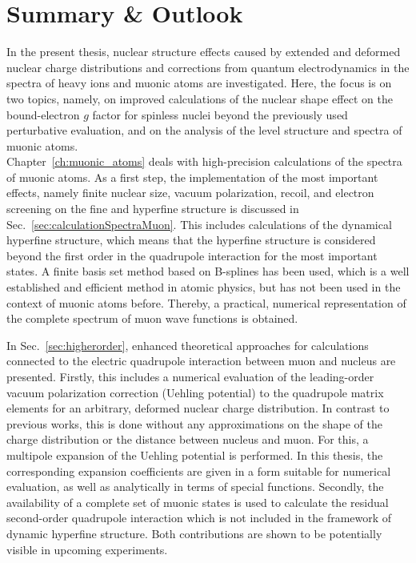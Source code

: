 \chapter*{Summary \& Outlook}
\label{ch:conclusion}

In the present thesis, nuclear structure effects caused by extended and deformed nuclear charge distributions and corrections from quantum electrodynamics in the spectra of heavy ions and muonic atoms are investigated. 
Here, the focus is on two topics, namely, on improved calculations of the nuclear shape effect on the bound-electron $g$ factor for spinless nuclei beyond the previously used perturbative evaluation, and on the analysis of the level structure and spectra of muonic atoms.\\[11pt]%
%
Chapter~\ref{ch:muonic_atoms} deals with high-precision calculations of the spectra of muonic atoms. 
As a first step, the implementation of the most important effects, namely finite nuclear size, vacuum polarization, recoil, and electron screening on the fine and hyperfine structure is discussed in Sec.~\ref{sec:calculationSpectraMuon}.
This includes calculations of the dynamical hyperfine structure, which means that the hyperfine structure is considered beyond the first order in the quadrupole interaction for the most important states.
A finite basis set method based on B-splines has been used, which is a well established and efficient method in atomic physics, but has not been used in the context of muonic atoms before. Thereby, a practical, numerical representation of the complete spectrum of muon wave functions is obtained.

In Sec.~\ref{sec:higherorder}, enhanced theoretical approaches for calculations connected to the electric quadrupole interaction between muon and nucleus are presented. 
Firstly, this includes a numerical evaluation of the leading-order vacuum polarization correction (Uehling potential) to the quadrupole matrix elements for an arbitrary, deformed nuclear charge distribution. In contrast to previous works, this is done without any approximations on the shape of the charge distribution or the distance between nucleus and muon. For this, a multipole expansion of the Uehling potential is performed. In this thesis, the corresponding expansion coefficients are given in a form suitable for numerical evaluation, as well as analytically in terms of special functions.
Secondly, the availability of a complete set of muonic states is used to calculate the residual second-order quadrupole interaction which is not included in the framework of dynamic hyperfine structure. 
Both contributions are shown to be potentially visible in upcoming experiments.

